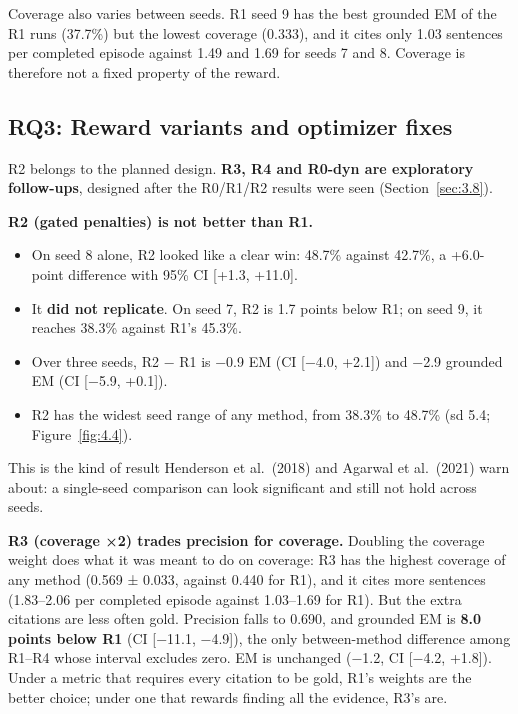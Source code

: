 Coverage also varies between seeds. R1 seed 9 has the best grounded EM
of the R1 runs (37.7\%) but the lowest coverage (0.333), and it cites
only 1.03 sentences per completed episode against 1.49 and 1.69 for
seeds 7 and 8. Coverage is therefore not a fixed property of the reward.

\subsection{RQ3: Reward variants and optimizer fixes}\label{sec:4.6}

R2 belongs to the planned design. \textbf{R3, R4 and R0-dyn are
exploratory follow-ups}, designed after the R0/R1/R2 results were seen
(Section~\ref{sec:3.8}).

\textbf{R2 (gated penalties) is not better than R1.}

\begin{itemize}
\tightlist
\item
  On seed 8 alone, R2 looked like a clear win: 48.7\% against 42.7\%, a
  +6.0-point difference with 95\% CI {[}+1.3, +11.0{]}.
\item
  It \textbf{did not replicate}. On seed 7, R2 is 1.7 points below R1;
  on seed 9, it reaches 38.3\% against R1's 45.3\%.
\item
  Over three seeds, R2 − R1 is −0.9 EM (CI {[}−4.0, +2.1{]}) and −2.9
  grounded EM (CI {[}−5.9, +0.1{]}).
\item
  R2 has the widest seed range of any method, from 38.3\% to 48.7\% (sd
  5.4; Figure~\ref{fig:4.4}).
\end{itemize}

This is the kind of result Henderson et al.~(2018) and Agarwal et
al.~(2021) warn about: a single-seed comparison can look significant and
still not hold across seeds.

\textbf{R3 (coverage ×2) trades precision for coverage.} Doubling the
coverage weight does what it was meant to do on coverage: R3 has the
highest coverage of any method (0.569 ± 0.033, against 0.440 for R1),
and it cites more sentences (1.83--2.06 per completed episode against
1.03--1.69 for R1). But the extra citations are less often gold.
Precision falls to 0.690, and grounded EM is \textbf{8.0 points below
R1} (CI {[}−11.1, −4.9{]}), the only between-method difference among
R1--R4 whose interval excludes zero. EM is unchanged (−1.2, CI {[}−4.2,
+1.8{]}). Under a metric that requires every citation to be gold, R1's
weights are the better choice; under one that rewards finding all the
evidence, R3's are.

